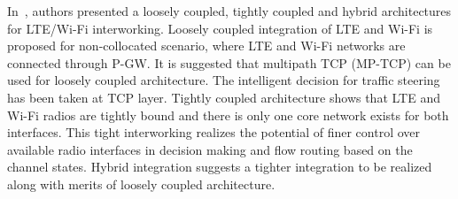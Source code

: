 \documentclass[conference]{IEEEtran}
\newcommand{\newlymodify}[1]{{#1}}
\begin{document}
%

In~\cite{7060499}, authors presented a loosely coupled, tightly coupled and hybrid architectures for LTE/Wi-Fi interworking. Loosely coupled integration of LTE and Wi-Fi is proposed for non-collocated scenario, where LTE and Wi-Fi networks are connected through P-GW. It is suggested that multipath TCP (MP-TCP) can be used for loosely coupled architecture. The intelligent decision for traffic steering has been taken at TCP layer. Tightly coupled architecture shows that LTE and Wi-Fi radios are tightly bound and there is only one core network exists for both interfaces. This tight interworking realizes the potential of finer control over available radio interfaces in decision making and flow routing based on the channel states. Hybrid integration suggests a tighter integration to be realized along with merits of loosely coupled architecture.
\end{document}

